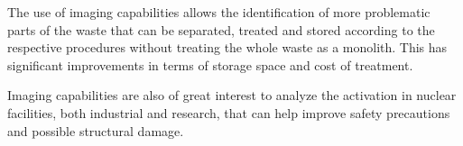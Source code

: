 The use of imaging capabilities allows the identification of more problematic parts of the waste that can be separated, treated and stored according to the respective procedures without treating the whole waste as a monolith. This has significant improvements in terms of storage space and cost of treatment.

Imaging capabilities are also of great interest to analyze the activation in nuclear facilities, both industrial and research, that can help improve safety precautions and possible structural damage.